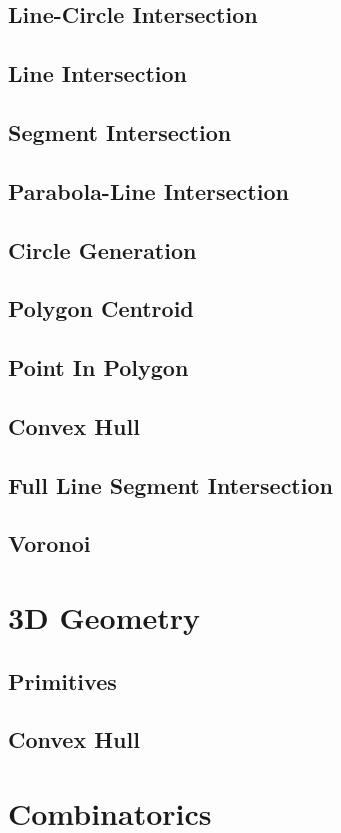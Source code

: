 \documentclass[twocolumn]{article}
\begin{document}
		\subsection{Line-Circle Intersection}
		\subsection{Line Intersection}
		\subsection{Segment Intersection}
		\subsection{Parabola-Line Intersection}
		\subsection{Circle Generation}
		\subsection{Polygon Centroid}
			
		\subsection{Point In Polygon}
		\subsection{Convex Hull}
		\subsection{Full Line Segment Intersection}
		\subsection{Voronoi}
	\section{3D Geometry}
		\subsection{Primitives}
		\subsection{Convex Hull}
	\section{Combinatorics}
\end{document}
